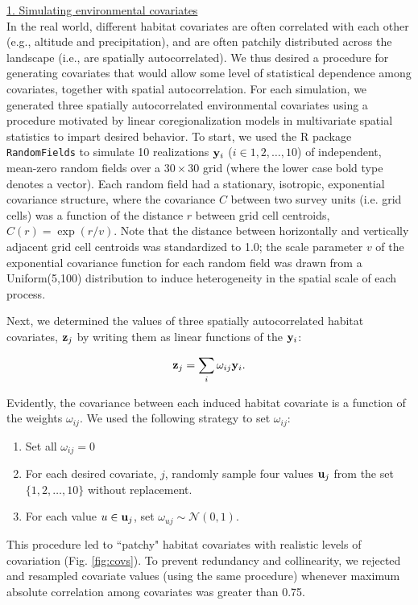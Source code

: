 \documentclass[12pt,fleqn]{article}
\begin{document}
\begin{flushleft}
\underline{1. Simulating environmental covariates} \\
In the real world, different habitat covariates are often correlated with each other (e.g., altitude and precipitation), and are often patchily distributed across the landscape (i.e., are spatially autocorrelated).  We thus desired a procedure for generating covariates that would allow some level of statistical dependence among covariates, together with spatial autocorrelation.  For each simulation, we generated three spatially autocorrelated environmental covariates using a procedure motivated by linear coregionalization models in multivariate spatial statistics \citep[e.g.][]{GoulardVoltz1992} to impart desired behavior.   To start, we used the R package \texttt{RandomFields} to simulate 10 realizations ${\bf y}_i$ ($i \in 1,2,\hdots,10$) of independent, mean-zero random fields over a $30 \times 30$ grid (where the lower case bold type denotes a vector).  Each random field had a stationary, isotropic, exponential covariance structure, where the covariance $C$ between two survey units (i.e. grid cells) was a function of the distance $r$ between grid cell centroids, $C(r)=\exp(r/v)$. Note that the distance between horizontally and vertically adjacent grid cell centroids was standardized to 1.0; the scale parameter $v$ of the exponential covariance function for each random field was drawn from a Uniform(5,100) distribution to induce heterogeneity in the spatial scale of each process.

Next, we determined the values of three spatially autocorrelated habitat covariates, ${\bf z}_j$ by writing them as linear functions of the ${\bf y}_i$:
\begin{linenomath}
\begin{equation*}
  {\bf z}_j = \sum_i \omega_{ij} {\bf y}_i.
\end{equation*}
\end{linenomath}
Evidently, the covariance between each induced habitat covariate is a function of the weights $\omega_{ij}$.  We used the following strategy to set $\omega_{ij}$:
\begin{enumerate}
  \item Set all $\omega_{ij}=0$
  \item For each desired covariate, $j$, randomly sample four values ${\bf u}_j$ from the set $\{ 1,2,\hdots,10\}$ without replacement.
  \item For each value $u \in {\bf u}_j$, set $\omega_{uj} \sim \mathcal{N}(0,1)$.
\end{enumerate}
This procedure led to ``patchy" habitat covariates with realistic levels of covariation (Fig. \ref{fig:covs}).  To prevent redundancy and collinearity, we rejected and resampled covariate values (using the same procedure) whenever maximum absolute correlation among covariates was greater than 0.75.



\end{flushleft}
\end{document}
